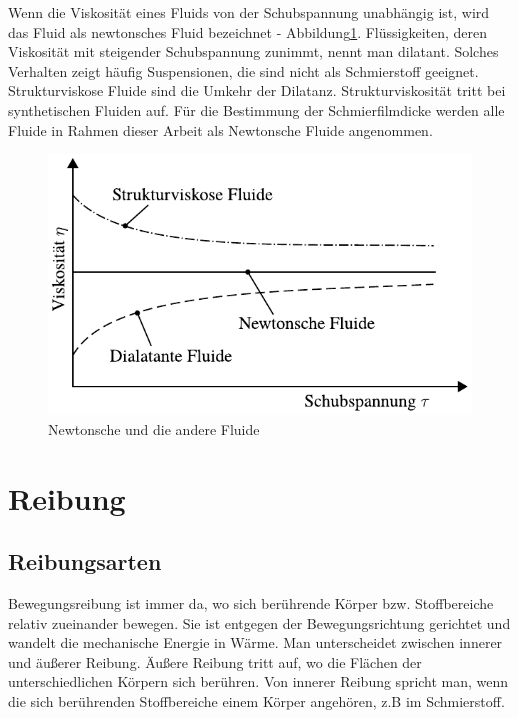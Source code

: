 Wenn die Viskosität eines Fluids von der Schubspannung unabhängig ist, wird das Fluid als newtonsches Fluid bezeichnet - Abbildung\ref{fig:newtonsche_fluide}.
Flüssigkeiten, deren Viskosität mit steigender Schubspannung zunimmt, nennt man dilatant.
Solches Verhalten zeigt häufig Suspensionen, die sind nicht als Schmierstoff geeignet.
Strukturviskose Fluide sind die Umkehr der Dilatanz.
Strukturviskosität tritt bei synthetischen Fluiden auf.
Für die Bestimmung der Schmierfilmdicke werden alle Fluide in Rahmen dieser Arbeit als Newtonsche Fluide angenommen.
\begin{figure}[htb]
    \centering
    \includegraphics[]{./images/newtonsche_nichtnewtonsche_fluide.pdf}
    \caption{Newtonsche und die andere Fluide\cite{wisniewski_2000}}
    \label{fig:newtonsche_fluide}
\end{figure}
%

\section{Reibung}
\label{sec:reibung}

\subsection{Reibungsarten}
\label{sub:reibungsarten}

Bewegungsreibung ist immer da, wo sich berührende Körper bzw. Stoffbereiche relativ zueinander bewegen.
Sie ist entgegen der Bewegungsrichtung gerichtet und wandelt die mechanische Energie in Wärme.
Man unterscheidet zwischen innerer und äußerer Reibung.
Äußere Reibung tritt auf, wo die Flächen der unterschiedlichen Körpern sich berühren.
Von innerer Reibung spricht man, wenn die sich berührenden Stoffbereiche einem Körper angehören, z.B im Schmierstoff.

